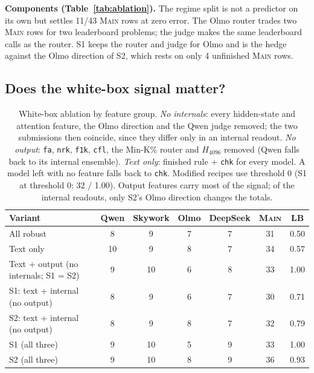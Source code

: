 \documentclass{article}
\newcommand{\sone}{\textsc{S1}}
\newcommand{\stwo}{\textsc{S2}}
\begin{document}
\textbf{Components (Table~\ref{tab:ablation}).}
The regime split is not a predictor on its own but settles 11/43 \textsc{Main} rows at zero error. The Olmo router trades two \textsc{Main} rows for two leaderboard problems; the judge makes the same leaderboard calls as the router. \sone{} keeps the router and judge for Olmo and is the hedge against the Olmo direction of \stwo{}, which rests on only 4 unfinished \textsc{Main} rows.

\subsection{Does the white-box signal matter?}
\label{sec:wb}
\begin{table}[t]
\caption{White-box ablation by feature group. \emph{No internals}: every hidden-state and attention feature, the Olmo direction and the Qwen judge removed; the two submissions then coincide, since they differ only in an internal readout. \emph{No output}: \texttt{fa}, \texttt{nrk}, \texttt{f1k}, \texttt{cfl}, the Min-K\% router and $H_{4096}$ removed (Qwen falls back to its internal ensemble). \emph{Text only}: finished rule + \texttt{chk} for every model. A model left with no feature falls back to \texttt{chk}. Modified recipes use threshold 0 (\sone{} at threshold 0: 32 / 1.00). Output features carry most of the signal; of the internal readouts, only \stwo{}'s Olmo direction changes the totals.}
\label{tab:wb}
\centering\small
\begin{tabular}{lcccccc}
\toprule
Variant & Qwen & Skywork & Olmo & DeepSeek & \textsc{Main} & LB \\
\midrule
All robust & 8 & 9 & 7 & 7 & 31 & 0.50 \\
Text only & 10 & 9 & 8 & 7 & 34 & 0.57 \\
Text + output (no internals; \sone{} = \stwo{}) & 9 & 10 & 6 & 8 & 33 & 1.00 \\
\sone{}: text + internal (no output) & 8 & 9 & 6 & 7 & 30 & 0.71 \\
\stwo{}: text + internal (no output) & 8 & 9 & 8 & 7 & 32 & 0.79 \\
\sone{} (all three) & 9 & 10 & 5 & 9 & 33 & 1.00 \\
\stwo{} (all three) & 9 & 10 & 8 & 9 & 36 & 0.93 \\
\bottomrule
\end{tabular}
\end{table}
\end{document}
